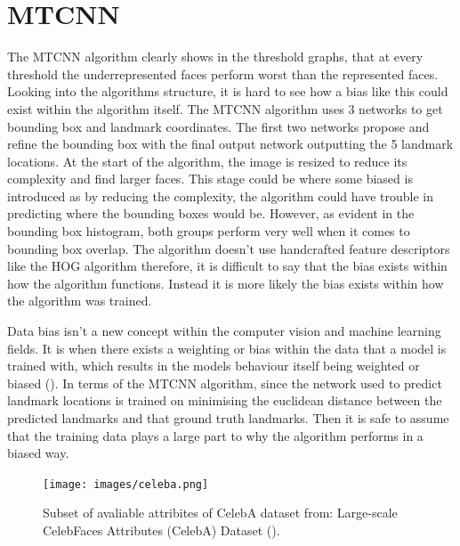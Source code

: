 \documentclass{l4proj}
\begin{document}
\section{MTCNN}
The MTCNN algorithm clearly shows in the threshold graphs, that at every threshold the underrepresented faces perform worst than the represented faces. Looking into the algorithms structure, it is hard to see how a bias like this could exist within the algorithm itself. The MTCNN algorithm uses 3 networks to get bounding box and landmark coordinates. The first two networks propose and refine the bounding box with the final output network outputting the 5 landmark locations. At the start of the algorithm, the image is resized to reduce its complexity and find larger faces. This stage could be where some biased is introduced as by reducing the complexity, the algorithm could have trouble in predicting where the bounding boxes would be. However, as evident in the bounding box histogram, both groups perform very well when it comes to bounding box overlap. The algorithm doesn't use handcrafted feature descriptors like the HOG algorithm therefore, it is difficult to say that the bias exists within how the algorithm functions. Instead it is more likely the bias exists within how the algorithm was trained.

Data bias isn't a new concept within the computer vision and machine learning fields. It is when there exists a weighting or bias within the data that a model is trained with, which results in the models behaviour itself being weighted or biased (\cite{datasetbias}). In terms of the MTCNN algorithm, since the network used to predict landmark locations is trained on minimising the euclidean distance between the predicted landmarks and that ground truth landmarks. Then it is safe to assume that the training data plays a large part to why the algorithm performs in a biased way.
\begin{figure}[h!]
  \centering
  \begin{minipage}{\textwidth}
  \centering
    \texttt{[image: images/celeba.png]}
    \caption{Subset of avaliable attribites of CelebA dataset from: Large-scale CelebFaces Attributes (CelebA) Dataset (\cite{celeba}).}
    \label{celebattri}
  \end{minipage}
  \hfill
  \end{figure}
  
\end{document}
